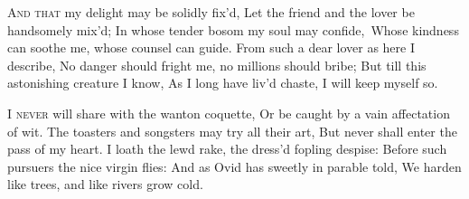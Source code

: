 \documentclass[fontsize=9, a5paper]{scrbook}
\begin{document}
\begin{poem}
	\begin{stanza}
		\textsc{And that} my delight may be solidly fix'd,\verseline
		Let the friend and the lover be handsomely mix'd;\verseline
		In whose tender bosom my soul may confide,\verseline\
		Whose kindness can soothe me, whose counsel can guide.\verseline
		From such a dear lover as here I describe,\verseline
		No danger should fright me, no millions should bribe;\verseline
		But till this astonishing creature I know,\verseline
		As I long have liv'd chaste, I will keep myself so.
	\end{stanza}
	
	\begin{stanza}
		\textsc{I never} will share with the wanton coquette,\verseline
		Or be caught by a vain affectation of wit.\verseline
		The toasters and songsters may try all their art,\verseline
		But never shall enter the pass of my heart.\verseline
		I loath the lewd rake, the dress'd fopling despise:\verseline
		Before such pursuers the nice virgin flies:\verseline
		And as Ovid has sweetly in parable told,\verseline
		We harden like trees, and like rivers grow cold. 
	\end{stanza}
\end{poem}

\pagebreak
\end{document}
